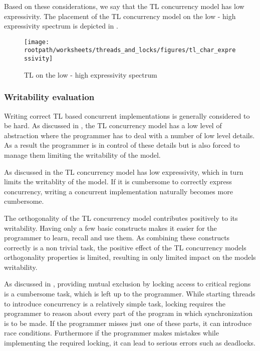 Based on these considerations, we say that the \ac{TL} concurrency model has low expressivity. The placement of the \ac{TL} concurrency model on the low - high expressivity spectrum is depicted in .

\begin{figure}[htbp]
\centering
 \texttt{[image: \\rootpath/worksheets/threads\_and\_locks/figures/tl\_char\_expressivity]} 
 \caption{\ac{TL} on the low - high expressivity spectrum}
\label{fig:char_tl_expressivity}
\end{figure}

\subsubsection{Writability evaluation}
Writing correct \ac{TL} based concurrent implementations is generally considered to be hard\cite[p. 56]{sutter2005software}. As discussed in , the \ac{TL} concurrency model has a low level of abstraction where the programmer has to deal with a number of low level details. As a result the programmer is in control of these details but is also forced to manage them limiting the writability of the model.

As discussed in  the \ac{TL} concurrency model has low expressivity, which in turn limits the writablity of the model. If it is cumbersome to correctly express concurrency, writing a concurrent implementation naturally becomes more cumbersome.

The orthogonality of the \ac{TL} concurrency model contributes positively to its writability. Having only a few basic constructs makes it easier for the programmer to learn, recall and use them. As combining these constructs correctly is a non trivial task, the positive effect of the \ac{TL} concurrency models orthogonality properties is limited, resulting in only limited impact on the models writability.

As discussed in , providing mutual exclusion by locking access to critical regions is a cumbersome task, which is left up to the programmer. While starting threads to introduce concurrency is a relatively simple task, locking requires the programmer to reason about every part of the program in which synchronization is to be made. If the programmer misses just one of these parts, it can introduce race conditions. Furthermore if the programmer makes mistakes while implementing the required locking, it can lead to serious errors such as deadlocks.

